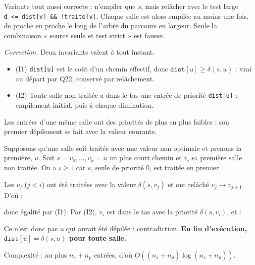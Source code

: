\documentclass[11pt,a4paper]{article}
\providecommand{\tightlist}{\setlength{\itemsep}{0pt}\setlength{\parskip}{0pt}}
\newcommand{\equationajustee}[1]{%
  \sbox{\boiteequation}{$\displaystyle #1$}%
  \ifdim\wd\boiteequation>\linewidth
    \[\resizebox{\linewidth}{!}{\usebox{\boiteequation}}\]%
  \else
    \[#1\]%
  \fi}
\begin{document}
Variante tout aussi correcte : n'empiler que \(s\), mais relâcher avec le test large \texttt{d\ \textless{}=\allowbreak{}\ dist{[}v{]}\allowbreak{}\ \&\&\ !traite{[}v{]}\allowbreak{}}. Chaque salle est alors empilée au moins une fois, de proche en proche le long de l'arbre du parcours en largeur. Seule la combinaison « source seule et test strict » est fausse.

\emph{Correction.} Deux invariants valent à tout instant.

\begin{itemize}
\tightlist
\item
  (I1) \texttt{dist{[}u{]}} est le coût d'un chemin effectif, donc \(\texttt{dist}[u] \ge \delta(s,u)\) : vrai au départ par Q22, conservé par relâchement.
\item
  (I2) Toute salle non traitée a dans le tas une entrée de priorité \texttt{dist{[}u{]}} : empilement initial, puis à chaque diminution.
\end{itemize}

Les entrées d'une même salle ont des priorités de plus en plus faibles : son premier dépilement se fait avec la valeur courante.

Supposons qu'une salle soit traitée avec une valeur non optimale et prenons la première, \(u\). Soit \(s = v_0, \dots, v_k = u\) un plus court chemin et \(v_i\) sa première salle non traitée. On a \(i \ge 1\) car \(s\), seule de priorité 0, est traitée en premier.

Les \(v_j\) (\(j < i\)) ont été traitées avec la valeur \(\delta(s,v_j)\) et ont relâché \(v_j \to v_{j+1}\). D'où :

\equationajustee{\begin{aligned}
\texttt{dist}[v_i] &\le \delta(s,v_{i-1}) + c(v_{i-1},v_i) \\
&= \delta(s,v_i),
\end{aligned}}

donc égalité par (I1). Par (I2), \(v_i\) est dans le tas avec la priorité \(\delta(s,v_i)\), et :

\equationajustee{\begin{aligned}
\delta(s,v_i) &\le \delta(s,u) \\
&< \texttt{dist}[u].
\end{aligned}}

Ce n'est donc pas \(u\) qui aurait été dépilée : contradiction. \textbf{En fin d'exécution, \(\texttt{dist}[u] = \delta(s,u)\) pour toute salle.}

Complexité : au plus \(n_s + n_p\) entrées, d'où \(O((n_s + n_p)\log(n_s + n_p))\).
\end{document}
